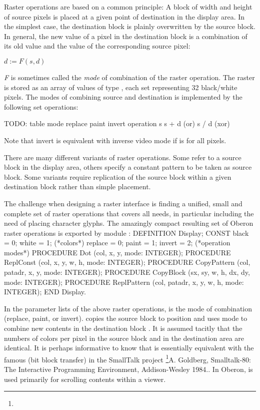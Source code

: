 Raster operations are based on a common principle: A block of width 
and height  of source pixels is placed at a given point of
destination  in the display area. In the simplest case, the
destination block  is plainly overwritten by the
source block. In general, the new value of a pixel in the destination
block is a combination of its old value and the value of the
corresponding source pixel:

$d := F(s, d)$

\emph{F} is sometimes called the \emph{mode} of combination of the
raster operation. The raster is stored as an array of values of type
, each set representing 32 black/white pixels. The modes of
combining source and destination is implemented by the following set
operations:

TODO: table
mode
replace paint invert
operation
s
s + d (or) s / d (xor)

Note that invert is equivalent with inverse video mode if  is 
for all pixels.

There are many different variants of raster operations. Some refer to
a source block in the display area, others specify a constant pattern
to be taken as source block. Some variants require replication of the
source block within a given destination block  rather
than simple placement.

The challenge when designing a raster interface is finding a unified,
small and complete set of raster operations that covers all needs, in
particular including the need of placing character glyphs. The
amazingly compact resulting set of Oberon raster operations is
exported by module :
\begintt
DEFINITION Display;
  CONST black = 0; white = 1; (*colors*)
        replace = 0; paint = 1; invert = 2; (*operation modes*)
  PROCEDURE Dot (col, x, y, mode: INTEGER);
  PROCEDURE ReplConst (col, x, y, w, h, mode: INTEGER);
  PROCEDURE CopyPattern (col, patadr, x, y, mode: INTEGER);
  PROCEDURE CopyBlock (sx, sy, w, h, dx, dy, mode: INTEGER);
  PROCEDURE ReplPattern (col, patadr, x, y, w, h, mode: INTEGER);
END Display.
\endtt

\noindent In the parameter lists of the above raster operations,  is the
mode of combination (replace, paint, or invert).  copies the
source block  to position  and uses mode to
combine new contents in the destination block . It is
assumed tacitly that the numbers of colors per pixel in the source
block and in the destination area are identical. It is perhaps
informative to know that  is essentially equivalent with the
famous  (bit block transfer) in the SmallTalk project
\footnote{{\mc[1]}}{A. Goldberg, Smalltalk-80: The Interactive Programming Environment, Addison-Wesley 1984.}. In Oberon,  is used primarily for scrolling
contents within a viewer.

